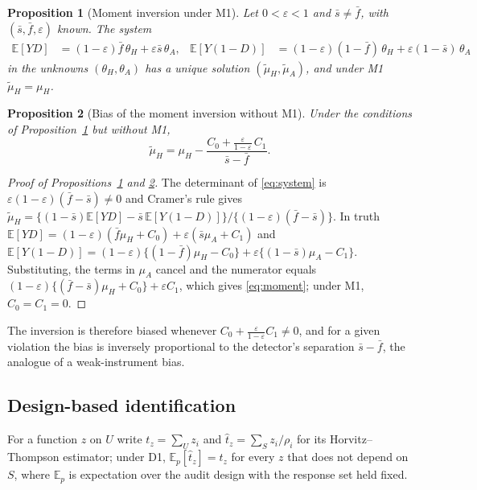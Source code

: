 \documentclass[11pt]{article}
\newtheorem{proposition}{Proposition}
\theoremstyle{definition}
\newcommand{\E}{\mathbb{E}}
\newcommand{\muH}{\mu_H}
\begin{document}
\begin{proposition}[Moment inversion under M1]\label{p:moment}
Let $0<\varepsilon<1$ and $\bar s\neq\bar f$, with $(\bar s,\bar f,\varepsilon)$ known.
The system
\begin{align}\label{eq:system}
\E[YD]&=(1-\varepsilon)\bar f\,\theta_H+\varepsilon\bar s\,\theta_A,&
\E[Y(1-D)]&=(1-\varepsilon)(1-\bar f)\,\theta_H+\varepsilon(1-\bar s)\,\theta_A
\end{align}
in the unknowns $(\theta_H,\theta_A)$ has a unique solution $(\tilde\mu_H,\tilde\mu_A)$, and under M1
$\tilde\mu_H=\muH$.
\end{proposition}
\begin{proposition}[Bias of the moment inversion without M1]\label{p:momentbias}
Under the conditions of Proposition~\ref{p:moment} but without M1,
\begin{equation}\label{eq:moment}
\tilde\mu_H=\muH-\frac{C_0+\frac{\varepsilon}{1-\varepsilon}\,C_1}{\bar s-\bar f}.
\end{equation}
\end{proposition}
\begin{proof}[Proof of Propositions~\ref{p:moment} and \ref{p:momentbias}]
The determinant of \eqref{eq:system} is $\varepsilon(1-\varepsilon)(\bar f-\bar s)\neq0$ and
Cramer's rule gives $\tilde\mu_H=\{(1-\bar s)\E[YD]-\bar s\,\E[Y(1-D)]\}/
\{(1-\varepsilon)(\bar f-\bar s)\}$. In truth
$\E[YD]=(1-\varepsilon)(\bar f\muH+C_0)+\varepsilon(\bar s\mu_A+C_1)$ and
$\E[Y(1-D)]=(1-\varepsilon)\{(1-\bar f)\muH-C_0\}+\varepsilon\{(1-\bar s)\mu_A-C_1\}$.
Substituting, the terms in $\mu_A$ cancel and the numerator equals
$(1-\varepsilon)\{(\bar f-\bar s)\muH+C_0\}+\varepsilon C_1$, which gives
\eqref{eq:moment}; under M1, $C_0=C_1=0$.
\end{proof}
The inversion is therefore biased whenever $C_0+\frac{\varepsilon}{1-\varepsilon}C_1\neq0$,
and for a given violation the bias is inversely proportional to the detector's separation
$\bar s-\bar f$, the analogue of a weak-instrument bias.

\subsection{Design-based identification}\label{sec:ident}
For a function $z$ on $U$ write $t_z=\sum_U z_i$ and $\hat t_z=\sum_S z_i/\rho_i$ for its
Horvitz--Thompson estimator; under D1, $\E_p[\hat t_z]=t_z$ for every $z$ that does not
depend on $S$, where $\E_p$ is expectation over the audit design with the response set held
fixed.
\end{document}

